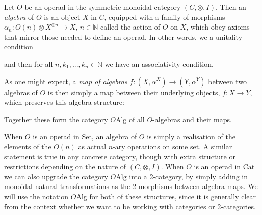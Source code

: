 \begin{defn} \label{opalg} Let $O$ be an operad in the symmetric monoidal category $(C, \otimes, I)$. Then an \emph{algebra} of $O$ is an object $X$ in $C$, equipped with a family of morphisms $\alpha_n : O(n) \otimes X^{\otimes n} \to X$, $n \in \mathbb{N}$ called the action of $O$ on $X$, which obey axioms that mirror those needed to define an operad. In other words, we a unitality condition
\begin{eq*}  \end{eq*}
and then for all $n, k_1, ...,  k_n \in \mathbb{N}$ we have an associativity condition,
\begin{eq*}  \end{eq*}
As one might expect, a \emph{map of algebras} $f: (X, \alpha^X) \to (Y, \alpha^Y)$ between two algebras of $O$ is then simply a map between their underlying objects, $f: X \to Y$, which preserves this algebra structure:
\begin{eq*}  \end{eq*}
Together these form the category $O\mathrm{Alg}$ of all $O$-algebras and their maps.
\end{defn}

When $O$ is an operad in $\mathrm{Set}$, an algebra of $O$ is simply a realisation of the elements of the $O(n)$ as actual $n$-ary operations on some set. A similar statement is true in any concrete category, though with extra structure or restrictions depending on the nature of $(C, \otimes, I)$. When $O$ is an operad in $\mathrm{Cat}$ we can also upgrade the category $O\mathrm{Alg}$ into a 2-category, by simply adding in monoidal natural transformations as the 2-morphisms between algebra maps. We will use the notation $O\mathrm{Alg}$ for both of these structures, since it is generally clear from the context whether we want to be working with categories or 2-categories.

